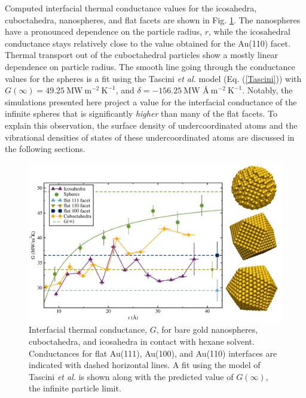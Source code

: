 Computed interfacial thermal conductance values for the icosahedra,
cuboctahedra, nanospheres, and flat facets are shown in
Fig. \ref{fig:ico_vs_sphere}.  The nanospheres have a pronounced
dependence on the particle radius, $r$, while the icosahedral
conductance stays relatively close to the value obtained for the
Au(110) facet. Thermal transport out of the cuboctahedral particles
show a mostly linear dependence on particle radius.  The smooth line
going through the conductance values for the spheres is a fit using
the Tascini \textit{et al.}\cite{Tascini2016} model
(Eq. (\ref{Tascini})) with
$G(\infty) = 49.25~\text{MW}~\text{m}^{-2}~\text{K}^{-1}$, and
$\delta = -156.25~\text{MW \AA}~\text{m}^{-2}~\text{K}^{-1}$.
Notably, the simulations presented here project a value for the interfacial
conductance of the infinite spheres that is significantly
\textit{higher} than many of the flat facets.  To explain this
observation, the surface density of undercoordinated atoms
and the vibrational densities of states of these undercoordinated
atoms are discussed in the following sections.

\begin{figure}
\includegraphics[width=\linewidth]{figures/g-ico-spher-cub.pdf}
	\caption{Interfacial thermal conductance, $G$, for bare gold
          nanospheres, cuboctahedra, and icosahedra in contact with
          hexane solvent. Conductances for flat Au(111), Au(100), and
          Au(110) interfaces are indicated with dashed horizontal
          lines.  A fit using the model of Tascini \textit{et al.} is
          shown along with the predicted value of $G(\infty)$, the
          infinite particle limit.}
	\label{fig:ico_vs_sphere}
\end{figure}

